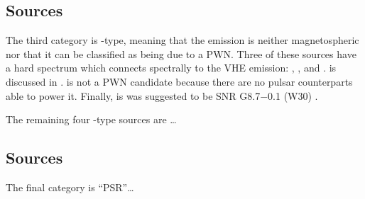 \subsection{\OtherClass Sources}

The third category is \OtherClass-type, meaning that the emission is
neither magnetospheric nor that it can be classified as being due to
a \ac{PWN}.  Three of these sources have a hard spectrum which connects
spectrally to the \ac{VHE} emission: , , and
.   is discussed in .
 is not a \ac{PWN} candidate because there are no pulsar
counterparts able to power it.  Finally,  is was suggested
to be SNR G8.7$-$0.1 (W30) \citep{ajello_2012a_fermi-large}.

The remaining four \OtherClass-type sources are \ldots

\subsection{\PSRClass Sources}

The final category is ``PSR''\ldots




